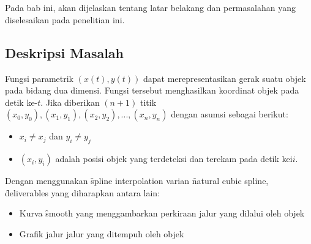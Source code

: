 \chapter{\babSatu}
\label{bab:1}
Pada bab ini, akan dijelaskan tentang latar belakang dan permasalahan yang diselesaikan pada penelitian ini.

\section{Deskripsi Masalah}
\label{sec:deskripsiMasalah}

Fungsi parametrik $(x(t),y(t))$ dapat merepresentasikan gerak suatu objek pada bidang dua dimensi. Fungsi tersebut menghasilkan koordinat objek pada detik ke-$t$.
Jika diberikan $(n+1)$ titik $(x_0,y_0),(x_1,y_1),(x_2,y_2),...,(x_n,y_n)$ dengan asumsi sebagai berikut:
\begin{itemize}
	\item $x_i \neq x_j$ dan $y_i \neq y_j$
	\item $(x_i,y_i)$ adalah posisi objek yang terdeteksi dan terekam pada detik kei$i$.
\end{itemize}
Dengan menggunakan \f{spline interpolation} varian \f{natural cubic spline}, \f{deliverables} yang diharapkan antara lain:
\begin{itemize}
	\item Kurva \f{smooth} yang menggambarkan perkiraan jalur yang dilalui oleh objek
	\item Grafik jalur jalur yang ditempuh oleh objek
\end{itemize}





